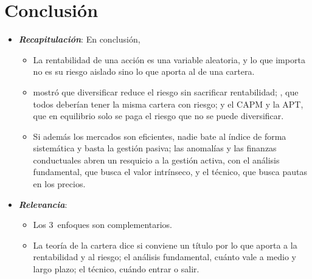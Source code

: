\documentclass[11pt]{article}
\begin{document}
\section*{Conclusión}

\begin{itemize}
\item \textbf{\emph{Recapitulación}}: En conclusión,
  \begin{itemize}
  \item La rentabilidad de una acción es una variable aleatoria, y lo que importa no es su riesgo aislado sino lo que aporta al de una cartera.

  \item {} mostró que diversificar reduce el riesgo sin sacrificar rentabilidad; , que todos deberían tener la misma cartera con riesgo; y el CAPM y la APT, que en equilibrio solo se paga el riesgo que no se puede diversificar.

  \item Si además los mercados son eficientes, nadie bate al índice de forma sistemática y basta la gestión pasiva; las anomalías y las finanzas conductuales abren un resquicio a la gestión activa, con el análisis fundamental, que busca el valor intrínseco, y el técnico, que busca pautas en los precios.
  \end{itemize}
\item \textbf{\emph{Relevancia}}:
  \begin{itemize}
  \item Los 3~enfoques son complementarios.

  \item La teoría de la cartera dice si conviene un título por lo que aporta a la rentabilidad y al riesgo; el análisis fundamental, cuánto vale a medio y largo plazo; el técnico, cuándo entrar o salir.


\end{itemize}
\end{itemize}
\end{document}
